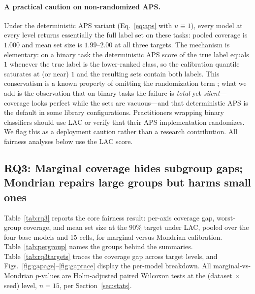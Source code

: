 \documentclass[review,12pt]{elsarticle}
\begin{document}
\paragraph{A practical caution on non-randomized APS.}
Under the deterministic APS variant (Eq.~\eqref{eq:aps} with $u\equiv 1$), every model at every level returns essentially the full label set on these tasks: pooled coverage is $1.000$ and mean set size is $1.99$--$2.00$ at all three targets. The mechanism is elementary: on a binary task the deterministic APS score of the true label equals $1$ whenever the true label is the lower-ranked class, so the calibration quantile saturates at (or near) $1$ and the resulting sets contain both labels. This conservatism is a known property of omitting the randomization term \cite{romano2020aps}; what we add is the observation that on binary tasks the failure is \emph{total} yet \emph{silent}---coverage looks perfect while the sets are vacuous---and that deterministic APS is the default in some library configurations. Practitioners wrapping binary classifiers should use LAC or verify that their APS implementation randomizes. We flag this as a deployment caution rather than a research contribution. All fairness analyses below use the LAC score.

\subsection{RQ3: Marginal coverage hides subgroup gaps; Mondrian repairs large groups but harms small ones}
\label{sec:rq3}

Table~\ref{tab:rq3} reports the core fairness result: per-axis coverage gap, worst-group coverage, and mean set size at the $90\%$ target under LAC, pooled over the four base models and 15 cells, for marginal versus Mondrian calibration. Table~\ref{tab:pergroup} names the groups behind the summaries. Table~\ref{tab:rq3targets} traces the coverage gap across target levels, and Figs.~\ref{fig:gapage}--\ref{fig:gaprace} display the per-model breakdown. All marginal-vs-Mondrian $p$-values are Holm-adjusted paired Wilcoxon tests at the (dataset $\times$ seed) level, $n=15$, per Section~\ref{sec:stats}.
\end{document}
